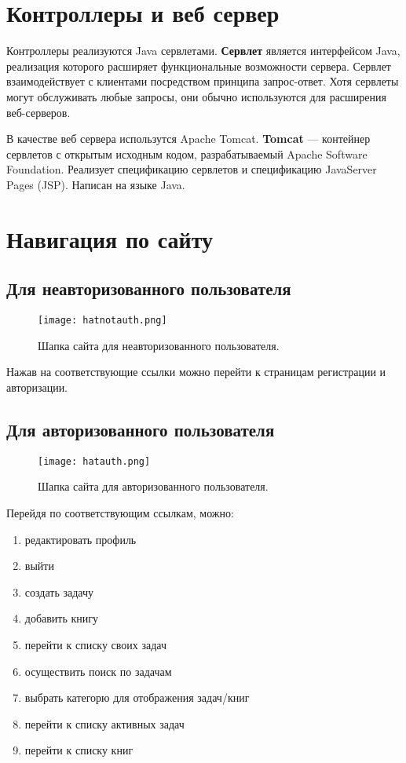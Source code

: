 \section{Контроллеры и веб сервер}

Контроллеры реализуются Java сервлетами. \textbf{Сервлет} является интерфейсом Java, реализация которого расширяет функциональные возможности сервера. Сервлет взаимодействует с клиентами посредством принципа запрос-ответ. Хотя сервлеты могут обслуживать любые запросы, они обычно используются для расширения веб-серверов.

В качестве веб сервера использутся Apache Tomcat. \textbf{Tomcat} — контейнер сервлетов с открытым исходным кодом, разрабатываемый Apache Software Foundation. Реализует спецификацию сервлетов и спецификацию JavaServer Pages (JSP). Написан на языке Java.



\section{Навигация по сайту} 

\subsection{Для неавторизованного пользователя} 

\begin{figure}[h]
  \centering
  \texttt{[image: hatnotauth.png]}
  \caption{ Шапка сайта для неавторизованного пользователя.}
\end{figure}

Нажав на соответствующие ссылки можно перейти к страницам регистрации и авторизации.

\subsection{Для авторизованного пользователя} 

\begin{figure}[h]
  \centering
  \texttt{[image: hatauth.png]}
  \caption{ Шапка сайта для авторизованного пользователя.}
\end{figure}

Перейдя по соответствующим ссылкам, можно:
\begin{enumerate}
\item редактировать профиль
\item выйти
\item создать задачу
\item добавить книгу
\item перейти к списку своих задач
\item осуществить поиск по задачам
\item выбрать категорю для отображения задач/книг
\item перейти к списку активных задач
\item перейти к списку книг
\end{enumerate}